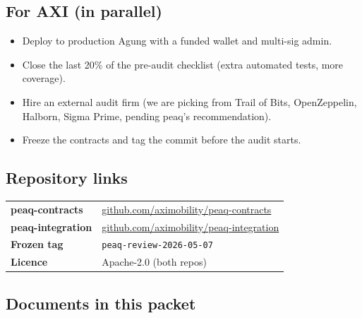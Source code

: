 \documentclass[11pt,a4paper]{article}
\begin{document}
\subsection{For AXI (in parallel)}

\begin{itemize}[leftmargin=*]
  \item Deploy to production Agung with a funded wallet and multi-sig admin.
  \item Close the last 20\% of the pre-audit checklist (extra automated tests, more coverage).
  \item Hire an external audit firm (we are picking from Trail of Bits, OpenZeppelin, Halborn, Sigma Prime, pending peaq's recommendation).
  \item Freeze the contracts and tag the commit before the audit starts.
\end{itemize}

\subsection{Repository links}

\begin{center}
\begin{tabular}{p{4cm} p{11.5cm}}
\toprule
\textbf{peaq-contracts} & \href{https://github.com/aximobility/peaq-contracts}{github.com/aximobility/peaq-contracts} \\
\textbf{peaq-integration} & \href{https://github.com/aximobility/peaq-integration}{github.com/aximobility/peaq-integration} \\
\textbf{Frozen tag} & \texttt{peaq-review-2026-05-07} \\
\textbf{Licence} & Apache-2.0 (both repos) \\
\bottomrule
\end{tabular}
\end{center}

\subsection{Documents in this packet}
\end{document}
